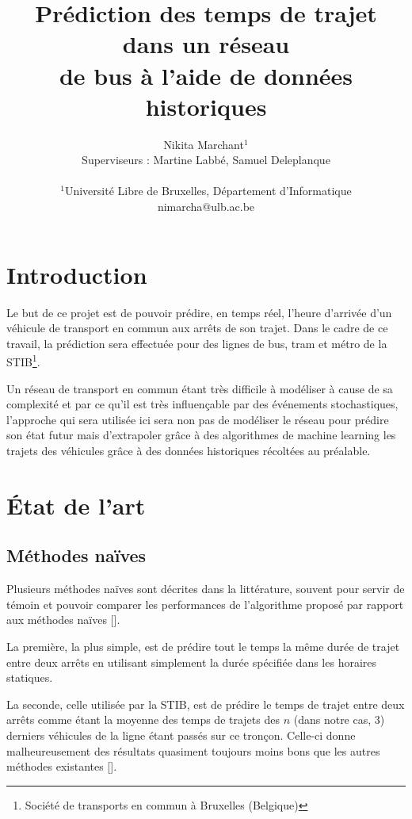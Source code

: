 \documentclass[letterpaper]{article}
\title{Prédiction des temps de trajet dans un réseau\\ de bus à l'aide de données historiques}
\author{Nikita Marchant$^{1}$\\
Superviseurs : Martine Labbé, Samuel Deleplanque
\mbox{}\\\\
$^1$Université Libre de Bruxelles, Département d'Informatique\\
nimarcha@ulb.ac.be}
\begin{document}
\maketitle

\begin{abstract}

\end{abstract}

\section{Introduction}

Le but de ce projet est de pouvoir prédire, en temps réel, l'heure d'arrivée d'un véhicule de transport en commun aux arrêts de son trajet.
Dans le cadre de ce travail, la prédiction sera effectuée pour des lignes de bus,
tram et métro de la STIB\footnote{Société de transports en commun à Bruxelles (Belgique)}.

Un réseau de transport en commun étant très difficile à modéliser à cause de sa complexité et par ce qu'il est très influençable par des événements stochastiques,
l'approche qui sera utilisée ici sera non pas de modéliser le réseau pour prédire son état futur mais d'extrapoler grâce à des algorithmes de machine learning les trajets des véhicules grâce à des données historiques récoltées au préalable.

\section{État de l'art}

\subsection{Méthodes naïves}

Plusieurs méthodes naïves sont décrites dans la littérature, souvent pour servir de témoin et pouvoir comparer les performances de l'algorithme proposé par rapport aux méthodes naïves [\cite{Altinkaya2013}].

La première, la plus simple, est de prédire tout le temps la même durée de trajet entre deux arrêts en utilisant simplement la durée spécifiée dans les horaires statiques.

La seconde, celle utilisée par la STIB, est de prédire le temps de trajet entre deux arrêts comme étant la moyenne des temps de trajets des $n$ (dans notre cas, 3) derniers véhicules de la ligne étant passés sur ce tronçon. Celle-ci donne malheureusement des résultats quasiment toujours moins bons que les autres méthodes existantes [\cite{Altinkaya2013}].
\end{document}
